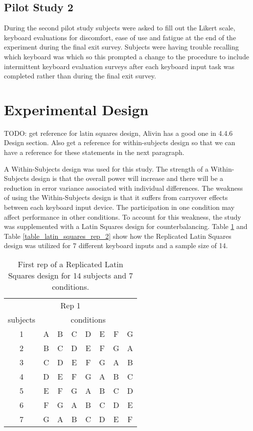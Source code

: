 \subsection{Pilot Study 2}

During the second pilot study subjects were asked to fill out the Likert scale, keyboard evaluations for discomfort, ease of use and fatigue at the end of the experiment during the final exit survey. Subjects were having trouble recalling which keyboard was which so this prompted a change to the procedure to include intermittent keyboard evaluation surveys after each keyboard input task was completed rather than during the final exit survey.

\section{Experimental Design} \label{3_experimental_design}

TODO: get reference for latin squares design, Alivin has a good one in 4.4.6 Design section. Also get a reference for within-subjects design so that we can have a reference for these statements in the next paragraph.

A Within-Subjects design was used for this study. The strength of a Within-Subjects design is that the overall power will increase and there will be a reduction in error variance associated with individual differences. The weakness of using the Within-Subjects design is that it suffers from carryover effects between each keyboard input device. The participation in one condition may affect performance in other conditions. To account for this weakness, the study was supplemented with a Latin Squares design for counterbalancing. Table \ref{table_latin_squares_rep_1} and Table \ref{table_latin_squares_rep_2} show how the Replicated Latin Squares design was utilized for 7 different keyboard inputs and a sample size of 14.

\begin{table}[h] %
\centering
\caption[Latin Squares Design Rep 1]{\centering First rep of a Replicated Latin Squares design for 14 subjects and 7 conditions.}
\label{table_latin_squares_rep_1}
\begin{tabular}{c | c c c c c c c}
    \hline
    \multicolumn{8}{c}{Rep 1} \\
    subjects & \multicolumn{7}{c}{conditions} \\
    \hline
    1 & A & B & C & D & E & F & G \\
    2 & B & C & D & E & F & G & A \\
    3 & C & D & E & F & G & A & B \\
    4 & D & E & F & G & A & B & C \\
    5 & E & F & G & A & B & C & D \\
    6 & F & G & A & B & C & D & E \\
    7 & G & A & B & C & D & E & F \\
    \hline
\end{tabular}
\end{table}

